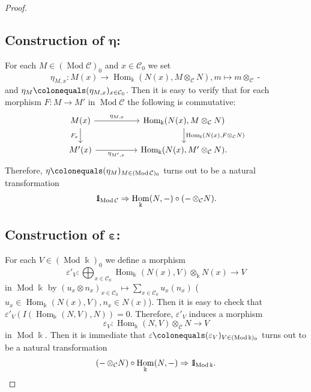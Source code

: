 \documentclass{surv-l}
\numberwithin{equation}{chapter}
\numberwithin{figure}{chapter}
\theoremstyle{plain}
\theoremstyle{definition}
\theoremstyle{remark}
\newcommand{\id}{1\kern-.25em{\text{{\rm l}}}}
\newcommand{\Ar}[3]{\ar[from={#1}, to={#2}, #3]}
\DeclareMathOperator{\Hom}{Hom}
\DeclareMathOperator{\Mod}{Mod}
\DeclareMathOperator{\blank}{-}
\begin{document}
\begin{proof}
\subsection*{Construction of $\boldsymbol{\eta}$:}
For each $M \in (\Mod{\mathcal{C}})_0$ and $x \in {\mathcal{C}}_0$ we set
\[
\eta_{M,x} \colon M(x) \to \Hom_\Bbbk(N(x), M\otimes_{\mathcal{C}} N), m \mapsto m \otimes_{\mathcal{C}} \blank
\]
and $\eta_M\colonequals  (\eta_{M,x})_{x \in {\mathcal{C}}_0}$.
Then it is easy to verify that for each morphism $F \colon M \to M'$ in
$\Mod{\mathcal{C}}$ the following is commutative:
\[
\begin{tikzcd}[column sep=5em]
M(x) & \Hom_\Bbbk(N(x), M \otimes_{\mathcal{C}} N)\\
M'(x) & \Hom_\Bbbk(N(x), M' \otimes_{\mathcal{C}} N).
\Ar{1-1}{1-2}{"{\eta_{M,x}}"}
\Ar{2-1}{2-2}{"{\eta_{M',x}}" '}
\Ar{1-1}{2-1}{"F_x"'}
\Ar{1-2}{2-2}{"{\Hom_\Bbbk(N(x), F \otimes_{\mathcal{C}} N)}"}
\end{tikzcd}
\]
Therefore, $\eta\colonequals  (\eta_M)_{M \in (\Mod{\mathcal{C}})_0}$ turns out to be a natural transformation
\[
\id_{\Mod{\mathcal{C}}} \Rightarrow \Hom_\Bbbk(N,\blank) \circ (\blank \otimes_{\mathcal{C}} N).
\]


\subsection*{Construction of $\boldsymbol{\varepsilon}$:}
For each $V \in (\Mod \Bbbk)_0$ we define a morphism
\[
\varepsilon'_V \colon \bigoplus_{x \in {\mathcal{C}}_0} \Hom_\Bbbk(N(x), V) \otimes_\Bbbk N(x) \to V
\]
in $\Mod \Bbbk$ by
$(u_x \otimes n_x)_{x \in {\mathcal{C}}_0} \mapsto \sum_{x \in {\mathcal{C}}_0}u_x(n_x)$
($u_x \in \Hom_\Bbbk(N(x), V), n_x \in N(x)$).
Then
it is easy to check that $\varepsilon'_V(I(\Hom_\Bbbk(N, V), N)) = 0$.
Therefore, $\varepsilon'_V$ induces a morphism
\[
\varepsilon_V \colon  \Hom_\Bbbk(N, V) \otimes_{\mathcal{C}} N \to V
\]
in $\Mod \Bbbk$.
Then it is immediate that $\varepsilon\colonequals  (\varepsilon_V)_{V \in (\Mod \Bbbk)_0}$
turns out to be a natural transformation
\[
(\blank \otimes_{\mathcal{C}} N)\circ \Hom_{\Bbbk}(N, \blank) \Rightarrow \id_{\Mod \Bbbk}.
\]


\end{proof}
\end{document}
